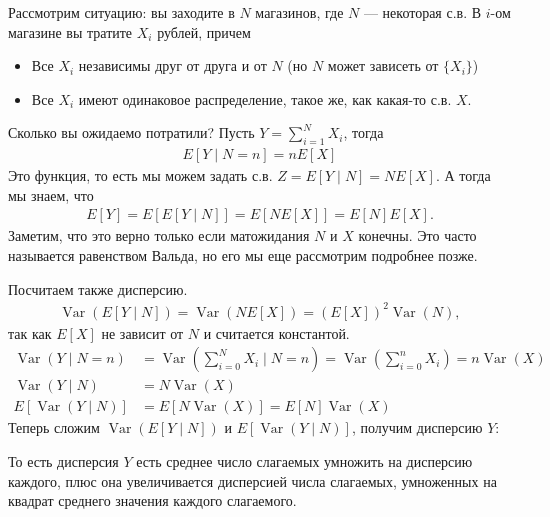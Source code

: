 \documentclass[12pt]{article}
\DeclareMathOperator{\Var}{Var}
\begin{document}
Рассмотрим ситуацию: вы заходите в $N$ магазинов, где $N$ --- некоторая с.в. В $i$-ом магазине вы тратите $X_i$ рублей, причем
\begin{itemize}
  \item Все $X_i$ независимы друг от друга и от $N$ (но $N$ может зависеть от $\{X_i\}$)
  \item Все $X_i$ имеют одинаковое распределение, такое же, как какая-то с.в. $X$.
\end{itemize}
Сколько вы ожидаемо потратили? Пусть $Y = \sum_{i = 1}^N X_i$, тогда 
\begin{align*}
  E[Y \mid N = n] = nE[X]
\end{align*}
Это функция, то есть мы можем задать с.в. $Z = E[Y \mid N] = NE[X]$. А тогда мы знаем, что
\begin{align*}
  E[Y] = E[E[Y \mid N]] = E[NE[X]] = E[N]E[X].
\end{align*}
Заметим, что это верно только если матожидания $N$ и $X$ конечны. Это часто называется равенством Вальда, но его мы еще рассмотрим подробнее позже.
\begin{center}
\end{center}


Посчитаем также дисперсию.
\begin{align*}
  \Var(E[Y\mid N]) = \Var(NE[X]) = (E[X])^2 \Var(N),
\end{align*}
так как $E[X]$ не зависит от $N$ и считается константой.
\begin{align}
  \Var(Y \mid N = n) &= \Var\left(\sum_{i = 0}^N X_i \mid N = n\right) = \Var\left(\sum_{i = 0}^n X_i\right) = n\Var(X) \\
  \Var(Y \mid N) &= N\Var(X) \\
  E[\Var(Y \mid N)] &= E[N\Var(X)] = E[N]\Var(X)
\end{align}
Теперь сложим $\Var(E[Y\mid N])$ и $E[\Var(Y \mid N)]$, получим дисперсию $Y$:
\begin{center}
\end{center}

То есть дисперсия $Y$ есть среднее число слагаемых умножить на дисперсию каждого, плюс она увеличивается дисперсией числа слагаемых, умноженных на квадрат среднего значения каждого слагаемого.
\end{document}
